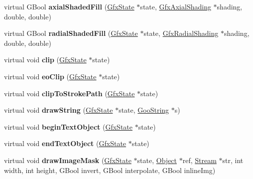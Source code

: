 \begin{DoxyCompactItemize}
virtual G\+Bool {\bfseries axial\+Shaded\+Fill} (\hyperlink{class_gfx_state}{Gfx\+State} $\ast$state, \hyperlink{class_gfx_axial_shading}{Gfx\+Axial\+Shading} $\ast$shading, double, double)
\item 
\mbox{\label{class_p_s_output_dev_a1fa710218e9132da132f36dd9ce8a687}} 
virtual G\+Bool {\bfseries radial\+Shaded\+Fill} (\hyperlink{class_gfx_state}{Gfx\+State} $\ast$state, \hyperlink{class_gfx_radial_shading}{Gfx\+Radial\+Shading} $\ast$shading, double, double)
\item 
\mbox{\label{class_p_s_output_dev_a3bd042c753cb1699f0e7a89650316ca2}} 
virtual void {\bfseries clip} (\hyperlink{class_gfx_state}{Gfx\+State} $\ast$state)
\item 
\mbox{\label{class_p_s_output_dev_a1587e1a2a88fc9388830b01a0eec3ff8}} 
virtual void {\bfseries eo\+Clip} (\hyperlink{class_gfx_state}{Gfx\+State} $\ast$state)
\item 
\mbox{\label{class_p_s_output_dev_ab0960ee48158916ff3e632d2961991fc}} 
virtual void {\bfseries clip\+To\+Stroke\+Path} (\hyperlink{class_gfx_state}{Gfx\+State} $\ast$state)
\item 
\mbox{\label{class_p_s_output_dev_a63b85492bf9a2122588b6564d6970dfd}} 
virtual void {\bfseries draw\+String} (\hyperlink{class_gfx_state}{Gfx\+State} $\ast$state, \hyperlink{class_goo_string}{Goo\+String} $\ast$s)
\item 
\mbox{\label{class_p_s_output_dev_a6262b47d45fd555a54cbcdd757299a93}} 
virtual void {\bfseries begin\+Text\+Object} (\hyperlink{class_gfx_state}{Gfx\+State} $\ast$state)
\item 
\mbox{\label{class_p_s_output_dev_a1de3c3ec33521049a1904d17f6461e4c}} 
virtual void {\bfseries end\+Text\+Object} (\hyperlink{class_gfx_state}{Gfx\+State} $\ast$state)
\item 
\mbox{\label{class_p_s_output_dev_ae6221a79de95c73ca3d5e0cb5b27b3ef}} 
virtual void {\bfseries draw\+Image\+Mask} (\hyperlink{class_gfx_state}{Gfx\+State} $\ast$state, \hyperlink{class_object}{Object} $\ast$ref, \hyperlink{class_stream}{Stream} $\ast$str, int width, int height, G\+Bool invert, G\+Bool interpolate, G\+Bool inline\+Img)

\end{DoxyCompactItemize}

